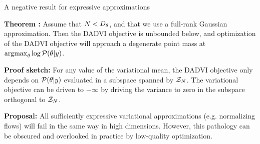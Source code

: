     
    
    \begin{frame}{A negative result for expressive approximations}
    
    \noindent
    \textbf{Theorem \citep{giordano:2023:dadvi}:}  Assume that $N < {D_{\theta}}$,
    and that we use a full-rank Gaussian approximation.  Then the DADVI objective is
    unbounded below, and optimization of the DADVI objective will approach a
    degenerate point mass at $\operatorname*{\mathrm{argmax}}_\theta \log \mathcal{P}(\theta \vert y)$.
    
    \pause
    
    \vspace{2em}
    \noindent
    \textbf{Proof sketch: }For any value of the variational
    mean, the DADVI objective only depends on $\mathcal{P}(\theta \vert y)$ evaluated
    in a subspace spanned by $\mathcal{Z}_{N}$.  The variational objective can be driven to 
    $-\infty$ by driving the variance to zero in the subspace orthogonal to $\mathcal{Z}_{N}$.
    
    \pause
    
    \vspace{2em}
    \noindent
    \textbf{Proposal: }  All sufficiently expressive variational approximations
    (e.g. normalizing flows) will fail in the same way in high dimensions. However,
    this pathology can be obscured and overlooked in practice by low-quality
    optimization.
    
    
    
    \end{frame}
    